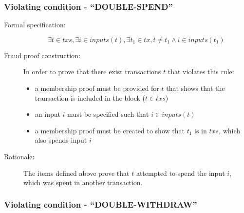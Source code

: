 \documentclass[../main.tex]{subfiles}
\begin{document}
\subsubsection{Violating condition - ``DOUBLE-SPEND''}
\label{sec:DOUBLE-SPEND}

\begin{description}

\item[Formal specification:]
\begin{equation*}
    \exists t \in txs, \exists i \in inputs(t), \exists t_1 \in tx, t \neq t_1 \land i \in inputs(t_1)
\end{equation*}

\item[Fraud proof construction:] In order to prove that there exist transactions $t$ that violates this rule:
\begin{itemize}
    \item a membership proof must be provided for $t$ that shows that the transaction is included in the block ($t \in txs$)
    \item an input $i$ must be specified such that $i \in inputs(t)$
    \item a membership proof must be created to show that $t_1$ is in $txs$, which also spends input $i$
\end{itemize}

\item[Rationale:] The items defined above prove that $t$ attempted to spend the input $i$, which was spent in another transaction.

\end{description}

\subsubsection{Violating condition - ``DOUBLE-WITHDRAW''}
\label{sec:DOUBLE-WITHDRAW}
\end{document}
